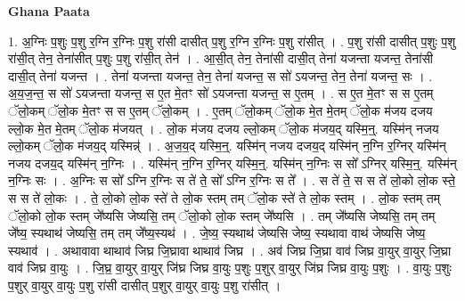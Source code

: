 \documentclass[17pt]{extarticle}
\begin{document}
\textbf{Ghana Paata } \newline

1. अ॒ग्निः प॒शुः प॒शु र॒ग्नि र॒ग्निः प॒शु रा॑सी दासीत् प॒शु र॒ग्नि र॒ग्निः प॒शु रा॑सीत् । . प॒शु रा॑सी दासीत् प॒शुः प॒शु रा॑सी॒त् तेन॒ तेना॑सीत् प॒शुः प॒शु रा॑सी॒त् तेन॑ । . आ॒सी॒त् तेन॒ तेना॑सी दासी॒त् तेना॑ यजन्ता यजन्त॒ तेना॑सी दासी॒त् तेना॑ यजन्त । . तेना॑ यजन्ता यजन्त॒ तेन॒ तेना॑ यजन्त॒ स सो॑ ऽयजन्त॒ तेन॒ तेना॑ यजन्त॒ सः । . अ॒य॒ज॒न्त॒ स सो॑ ऽयजन्ता यजन्त॒ स ए॒त मे॒तꣳ सो॑ ऽयजन्ता यजन्त॒ स ए॒तम् । . स ए॒त मे॒तꣳ स स ए॒तम् ॅलो॒कम् ॅलो॒क मे॒तꣳ स स ए॒तम् ॅलो॒कम् । . ए॒तम् ॅलो॒कम् ॅलो॒क मे॒त मे॒तम् ॅलो॒क म॑जय दजय ल्लो॒क मे॒त मे॒तम् ॅलो॒क म॑जयत् । . लो॒क म॑जय दजय ल्लो॒कम् ॅलो॒क म॑जय॒द् यस्मि॒न्॒. यस्मि॑न् नजय ल्लो॒कम् ॅलो॒क म॑जय॒द् यस्मिन्न्॑ । . अ॒ज॒य॒द् यस्मि॒न्॒. यस्मि॑न् नजय दजय॒द् यस्मि॑न् न॒ग्नि र॒ग्निर् यस्मि॑न् नजय दजय॒द् यस्मि॑न् न॒ग्निः । . यस्मि॑न् न॒ग्नि र॒ग्निर् यस्मि॒न्॒. यस्मि॑न् न॒ग्निः स सो᳚ ऽग्निर् यस्मि॒न्॒. यस्मि॑न् न॒ग्निः सः । . अ॒ग्निः स सो᳚ ऽग्नि र॒ग्निः स ते॑ ते॒ सो᳚ ऽग्नि र॒ग्निः स ते᳚ । . स ते॑ ते॒ स स ते॑ लो॒को लो॒क स्ते॒ स स ते॑ लो॒कः । . ते॒ लो॒को लो॒क स्ते॑ ते लो॒क स्तम् तम् ॅलो॒क स्ते॑ ते लो॒क स्तम् । . लो॒क स्तम् तम् ॅलो॒को लो॒क स्तम् जे᳚ष्यसि जेष्यसि॒ तम् ॅलो॒को लो॒क स्तम् जे᳚ष्यसि । . तम् जे᳚ष्यसि जेष्यसि॒ तम् तम् जे᳚ष्य॒ स्यथाथ॑ जेष्यसि॒ तम् तम् जे᳚ष्य॒स्यथ॑ । . जे॒ष्य॒ स्यथाथ॑ जेष्यसि जेष्य॒ स्यथावा वाथ॑ जेष्यसि जेष्य॒ स्यथाव॑ । . अथावावा थाथाव॑ जिघ्र जि॒घ्रावा थाथाव॑ जिघ्र । . अव॑ जिघ्र जि॒घ्रा वाव॑ जिघ्र वा॒युर् वा॒युर् जि॒घ्रा वाव॑ जिघ्र वा॒युः । . जि॒घ्र॒ वा॒युर् वा॒युर् जि॑घ्र जिघ्र वा॒युः प॒शुः प॒शुर् वा॒युर् जि॑घ्र जिघ्र वा॒युः प॒शुः । . वा॒युः प॒शुः प॒शुर् वा॒युर् वा॒युः प॒शु रा॑सी दासीत् प॒शुर् वा॒युर् वा॒युः प॒शु रा॑सीत् । \newline
\end{document}
